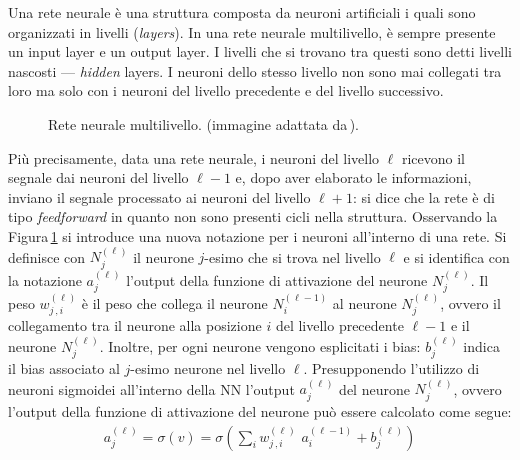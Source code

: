 Una rete neurale è una struttura composta da neuroni artificiali i quali sono organizzati in livelli (\textit{layers}). In una rete neurale multilivello, è sempre presente un input layer e un output layer. I livelli che si trovano tra questi sono detti livelli nascosti — \textit{hidden} layers. I neuroni dello stesso livello non sono mai collegati tra loro ma solo con i neuroni del livello precedente e del livello successivo.
% 
\begin{figure}[!b]
    \centering
    
    \caption[Rete neurale multilivello.]{Rete neurale multilivello. (immagine adattata da\,\cite{izaak2022neural}).}\label{fig:neural-network}
\end{figure}
% 
Più precisamente, data una rete neurale, i neuroni del livello $\ell$ ricevono il segnale dai neuroni del livello $\ell-1$ e, dopo aver elaborato le informazioni, inviano il segnale processato ai neuroni del livello $\ell+1$: si dice che la rete è di tipo \textit{feedforward} in quanto non sono presenti cicli nella struttura. Osservando la Figura\,\ref{fig:neural-network} si introduce una nuova notazione per i neuroni all'interno di una rete. Si definisce con $N^{(\ell)}_j$ il neurone $j$-esimo che si trova nel livello $\ell$ e si identifica con la notazione $a^{(\ell)}_j$ l'output della funzione di attivazione del neurone $N^{(\ell)}_j$. Il peso $w^{(\ell)}_{j\,,i}$ è il peso che collega il neurone $N^{(\ell - 1)}_i$ al neurone $N^{(\ell)}_j$, ovvero il collegamento tra il neurone alla posizione $i$ del livello precedente $\ell-1$ e il neurone $N^{(\ell)}_j$. Inoltre, per ogni neurone vengono esplicitati i bias: $b^{(\ell)}_j$ indica il bias associato al $j$-esimo neurone nel livello $\ell$. Presupponendo l'utilizzo di neuroni sigmoidei all'interno della \acs{NN} l'output $a^{(\ell)}_j$ del neurone $N^{(\ell)}_j$, ovvero l'output della funzione di attivazione del neurone può essere calcolato come segue: 
% 
\begin{gather*}
     a^{(\ell)}_j = \sigma\left( v \right) = \sigma\left( \sum_i w^{(\ell)}_{j\,,i} \,\, a^{(\ell - 1)}_i + b^{(\ell)}_j \right)
\end{gather*}

